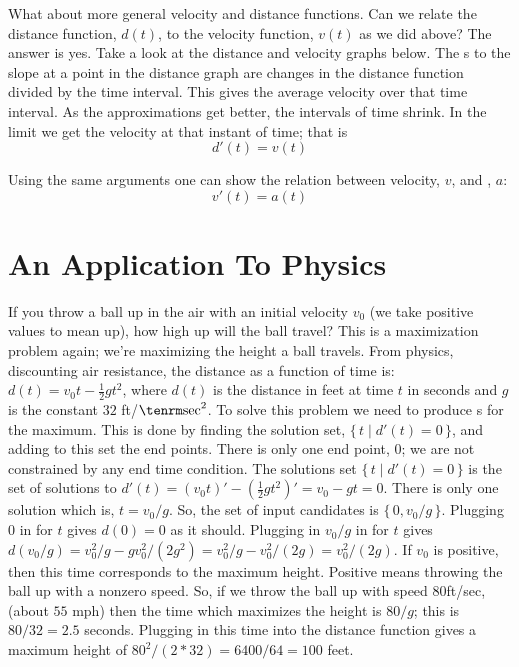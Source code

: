 What about more general velocity and distance functions. Can we relate the
distance function, $d(t)$, to the velocity function, $v(t)$ as we did above?
The answer is yes. Take a look at the distance and velocity graphs below. 
The s to the slope at a point in the distance 
graph are changes in the distance function divided by the time interval. 
This gives the average velocity over that time interval. As the approximations
get better, the intervals of time shrink. In the limit we get the 
velocity at that instant of time; that is
$$
d'(t) = v(t)
$$

Using the same arguments one can show the relation between velocity, $v$,
and , $a$:
$$
v'(t) = a(t)
$$

\section{An Application To Physics}
If you throw a ball up in the air with an initial velocity $v_0$ (we take positive values to mean up), how high up
will the ball travel? This is a maximization problem again; we're maximizing the height a ball travels.
From physics, discounting air resistance, the
distance as a function of time is: $d(t) = v_0 t - \frac{1}{2} g t^2$,
where $d(t)$ is the distance in feet at time $t$ in seconds and $g$ is the constant $32$ ft/${\rm sec}^2$.
To solve this problem we need to 
produce s for the maximum. This is done by finding the solution 
set, 
$\{ \, t \mid d'(t) = 0 \, \}$, and adding to this set the end points. 
There is only one end point, $0$; we are not constrained by any end time 
condition. The solutions set $\{ \, t \mid d'(t) = 0 \, \}$ is the set of 
solutions to
$d'(t) = (v_0 t)' - (\frac{1}{2} g t^2)' = v_0 - g t = 0$.
There is only one solution which is, $t = v_0/g$. So, the set of input 
candidates is 
$\{\, 0, v_0/g \,\}$. Plugging $0$ in for $t$ gives $d(0) = 0$ as it should.
Plugging in $v_0/g$ in for $t$ gives $d(v_0/g) = v_0^2/g - g v_0^2/(2g^2) =
v_0^2/g - v_0^2/(2g) = v_0^2/(2g)$. If $v_0$ is positive, then this time
corresponds to the maximum height. Positive means throwing the ball up with 
a nonzero speed. So, if we throw the ball up with speed $80$ft/sec, 
(about $55$ mph) then 
the time which maximizes the height is 
$80/g$; this is $80/32 = 2.5$ seconds. Plugging in this time into the 
distance function 
gives a maximum height of $80^2/(2 * 32) = 6400/64 = 100$ feet. 

